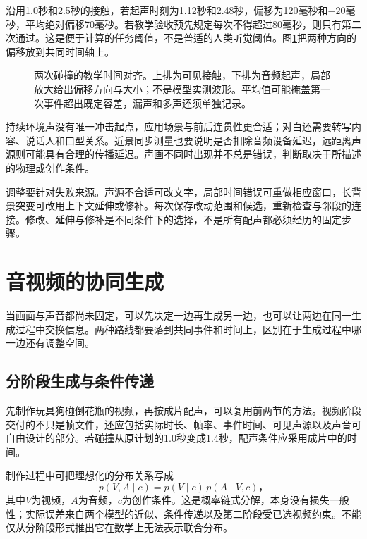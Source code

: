 沿用1.0秒和2.5秒的接触，若起声时刻为1.12秒和2.48秒，偏移为120毫秒和$-20$毫秒，平均绝对偏移70毫秒。若教学验收预先规定每次不得超过80毫秒，则只有第二次通过。这是便于计算的任务阈值，不是普适的人类听觉阈值。图\ref{fig:vision-event-sync}把两种方向的偏移放到共同时间轴上。

\begin{figure}[htbp]
  \centering
  
  \caption{两次碰撞的教学时间对齐。上排为可见接触，下排为音频起声，局部放大给出偏移方向与大小；不是模型实测波形。平均值可能掩盖第一次事件超出既定容差，漏声和多声还须单独记录。}
  \label{fig:vision-event-sync}
\end{figure}
\FloatBarrier

持续环境声没有唯一冲击起点，应用场景与前后连贯性更合适；对白还需要转写内容、说话人和口型关系。近景同步测量也要说明是否扣除音频设备延迟，远距离声源则可能具有合理的传播延迟。声画不同时出现并不总是错误，判断取决于所描述的物理或创作条件。

调整要针对失败来源。声源不合适可改文字，局部时间错误可重做相应窗口，长背景突变可改用上下文延伸或修补。每次保存改动范围和候选，重新检查与邻段的连接。修改、延伸与修补是不同条件下的选择，不是所有配声都必须经历的固定步骤。

\section{音视频的协同生成}
\label{sec:vision-multigen-joint}

当画面与声音都尚未固定，可以先决定一边再生成另一边，也可以让两边在同一生成过程中交换信息。两种路线都要落到共同事件和时间上，区别在于生成过程中哪一边还有调整空间。

\subsection{分阶段生成与条件传递}
\label{sec:vision-multigen-staged}

先制作玩具狗碰倒花瓶的视频，再按成片配声，可以复用前两节的方法。视频阶段交付的不只是帧文件，还应包括实际时长、帧率、事件时间、可见声源以及声音可自由设计的部分。若碰撞从原计划的1.0秒变成1.4秒，配声条件应采用成片中的时间。

制作过程中可把理想化的分布关系写成
\[
  p(V,A\mid c)=p(V\mid c)\,p(A\mid V,c)\text{，}
\]
其中$V$为视频，$A$为音频，$c$为创作条件。这是概率链式分解，本身没有损失一般性；实际误差来自两个模型的近似、条件传递以及第二阶段受已选视频约束。不能仅从分阶段形式推出它在数学上无法表示联合分布。

